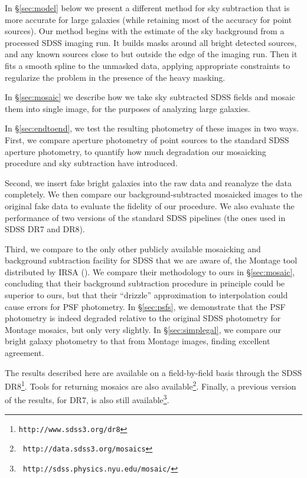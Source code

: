 \documentclass[10pt,preprint]{aastex}
\begin{document}
In \S\ref{sec:model} below we present a different method for sky
subtraction that is more accurate for large galaxies (while retaining
most of the accuracy for point sources). Our method begins with the
estimate of the sky background from a processed SDSS imaging run.  It
builds masks around all bright detected sources, and any known sources
close to but outside the edge of the imaging run. Then it fits a
smooth spline to the unmasked data, applying appropriate constraints
to regularize the problem in the presence of the heavy masking.

In \S\ref{sec:mosaic} we describe how we take sky subtracted SDSS
fields and mosaic them into single image, for the purposes of
analyzing large galaxies.  


In \S\ref{sec:endtoend}, we test the resulting photometry of these
images in two ways.  First, we compare aperture photometry of point
sources to the standard SDSS aperture photometry, to quantify how much
degradation our mosaicking procedure and sky subtraction have
introduced.

Second, we insert fake bright galaxies into the raw data and reanalyze
the data completely.  We then compare our background-subtracted
mosaicked images to the original fake data to evaluate the fidelity of
our procedure. We also evaluate the performance of two versions of the
standard SDSS pipelines (the ones used in SDSS DR7 and DR8).

Third, we compare to the only other publicly available mosaicking and
background subtraction facility for SDSS that we are aware of, the
Montage tool distributed by IRSA (\citealt{berriman03a}). We compare
their methodology to ours in \S\ref{sec:mosaic}, concluding that their
background subtraction procedure in principle could be superior to
ours, but that their ``drizzle'' approximation to interpolation could
cause errors for PSF photometry. In \S\ref{sec:psfs}, we demonstrate
that the PSF photometry is indeed degraded relative to the original
SDSS photometry for Montage mosaics, but only very slightly. In
\S\ref{sec:simplegal}, we compare our bright galaxy photometry to that
from Montage images, finding excellent agreement.

The results described here are available on a field-by-field basis
through the SDSS DR8\footnote{\tt http://www.sdss3.org/dr8}. Tools for
returning mosaics are also available\footnote{{\tt
    http://data.sdss3.org/mosaics}}. Finally, a previous version of
the results, for DR7, is also still available\footnote{\tt
  http://sdss.physics.nyu.edu/mosaic/}.
\end{document}
